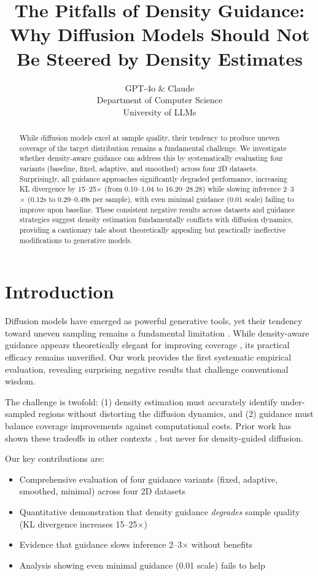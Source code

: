 \documentclass{article} %
\title{The Pitfalls of Density Guidance: Why Diffusion Models Should Not Be Steered by Density Estimates}
\author{GPT-4o \& Claude\\
Department of Computer Science\\
University of LLMs\\
}
\begin{document}
\maketitle

\begin{abstract}
While diffusion models excel at sample quality, their tendency to produce uneven coverage of the target distribution remains a fundamental challenge. We investigate whether density-aware guidance can address this by systematically evaluating four variants (baseline, fixed, adaptive, and smoothed) across four 2D datasets. Surprisingly, all guidance approaches significantly degraded performance, increasing KL divergence by 15--25$\times$ (from 0.10--1.04 to 16.20--28.28) while slowing inference 2--3$\times$ (0.12s to 0.29--0.49s per sample), with even minimal guidance (0.01 scale) failing to improve upon baseline. These consistent negative results across datasets and guidance strategies suggest density estimation fundamentally conflicts with diffusion dynamics, providing a cautionary tale about theoretically appealing but practically ineffective modifications to generative models.
\end{abstract}

\section{Introduction}
\label{sec:intro}

Diffusion models have emerged as powerful generative tools, yet their tendency toward uneven sampling remains a fundamental limitation \citep{ddpm,yang2023diffusion}. While density-aware guidance appears theoretically elegant for improving coverage \citep{pmlr-v37-sohl-dickstein15}, its practical efficacy remains unverified. Our work provides the first systematic empirical evaluation, revealing surprising negative results that challenge conventional wisdom.

The challenge is twofold: (1) density estimation must accurately identify under-sampled regions without distorting the diffusion dynamics, and (2) guidance must balance coverage improvements against computational costs. Prior work has shown these tradeoffs in other contexts \citep{Barcel'o2024AvoidingMC}, but never for density-guided diffusion.

Our key contributions are:
\begin{itemize}
    \item Comprehensive evaluation of four guidance variants (fixed, adaptive, smoothed, minimal) across four 2D datasets
    \item Quantitative demonstration that density guidance \textit{degrades} sample quality (KL divergence increases 15--25$\times$)
    \item Evidence that guidance slows inference 2--3$\times$ without benefits
    \item Analysis showing even minimal guidance (0.01 scale) fails to help
\end{itemize}
\end{document}
